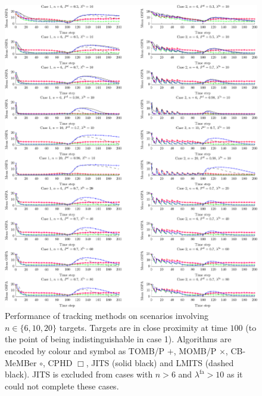 \documentclass[journal,twoside]{IEEEtran}
\theoremstyle{plain}
\begin{document}
\begin{figure}[p]
\includegraphics[width=7in]{figure5.pdf}
\fi
\vspace{-6pt}
\caption{Performance of tracking methods on scenarios involving $n\in\{6,10,20\}$ targets. Targets are in close proximity at time $100$ (to the point of being indistinguishable in case 1). Algorithms are encoded by colour and symbol as TOMB/P {\color{blue}$+$}, MOMB/P {\color{green}$\times$}, CB-MeMBer {\color[rgb]{1,0,1}$\circ$}, CPHD {\color{red}$\Box$}, JITS (solid black) and LMITS (dashed black). JITS is excluded from cases with $n>6$ and $\lambda^\mathrm{fa}>10$ as it could not complete these cases.}
\label{fig:Results}
\vspace{-6pt}
\end{figure}
%
\afterpage{\clearpage}
%
\end{document}
